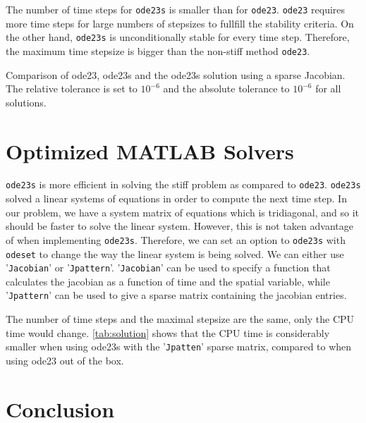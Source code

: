 \documentclass{article}
\begin{document}
The number of time steps for \texttt{ode23s} is smaller than for
\texttt{ode23}. \texttt{ode23} requires more time steps for large numbers of
stepsizes to fullfill the stability criteria. On the other hand,
\texttt{ode23s} is unconditionally stable for every time step. Therefore, the
maximum time stepsize is bigger than the non-stiff method \texttt{ode23}.
\begin{table}[!h]
 \caption{Comparison of ode23, ode23s and the ode23s solution using a sparse
   Jacobian. The relative tolerance is set to $10^{-6}$ and the absolute
   tolerance to $10^{-6}$ for all solutions.}
 \label{tab:solution}
 \pgfplotstabletranspose[colnames from=N, input colnames to=N,string type]\partfourtransposed{\partfour}
 \centering\pgfplotstabletypeset[every nth row={3[-1]}{after row=\midrule},
   every head row/.style={
     before row=\toprule,
     after row=\midrule
   }, string type, skip first n=4,
   every last row/.style={
     after row=\bottomrule
     },]{\partfourtransposed}
\end{table}

\section{Optimized MATLAB Solvers}

\texttt{ode23s} is more efficient in solving the stiff problem as compared to
\texttt{ode23}. \texttt{ode23s} solved a linear systems of equations in order
to compute the next time step. In our problem, we have a system matrix of
equations which is tridiagonal, and so it should be faster to solve the linear
system. However, this is not taken advantage of when implementing
\texttt{ode23s}. Therefore, we can set an option to \texttt{ode23s} with
\texttt{odeset} to change the way the linear system is being solved. We can
either use '\texttt{Jacobian}' or '\texttt{Jpattern}'. '\texttt{Jacobian}'
can be used to specify a function that calculates the jacobian as a function
of time and the spatial variable, while '\texttt{Jpattern}' can be used to
give a sparse matrix containing the jacobian entries.

The number of time steps and the maximal stepsize are the same, only the CPU
time would change. \cref{tab:solution} shows that the CPU time is considerably
smaller when using ode23s with the '\texttt{Jpatten}' sparse matrix, compared
to when using ode23 out of the box.

\section{Conclusion}
\end{document}
